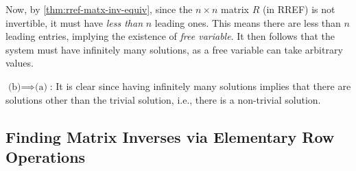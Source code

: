 \begin{enumerate}
\begin{pf}
Now, by \cref{thm:rref-matx-inv-equiv}, since the \(n\times n\) matrix \(R\)
(in RREF) is not invertible, it must have \emph{less than} \(n\) leading ones.
This means there are less than \(n\) leading entries, implying the existence of
\emph{free variable}. It then follows that the system must have infinitely many
solutions, as a free variable can take arbitrary values.

\underline{\(\text{(b)}\implies\text{(a)}\)}: It is clear since having
infinitely many solutions implies that there are solutions other than the trivial
solution, i.e., there is a non-trivial solution.
\end{pf}
\end{enumerate}
\subsection{Finding Matrix Inverses via Elementary Row Operations}

